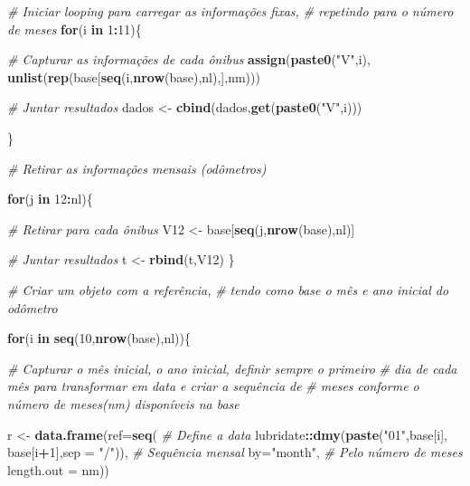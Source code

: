 \documentclass[]{article}
\newenvironment{Shaded}{\begin{snugshade}}{\end{snugshade}}
\newcommand{\CommentTok}[1]{\textcolor[rgb]{0.56,0.35,0.01}{\textit{#1}}}
\newcommand{\ControlFlowTok}[1]{\textcolor[rgb]{0.13,0.29,0.53}{\textbf{#1}}}
\newcommand{\DataTypeTok}[1]{\textcolor[rgb]{0.13,0.29,0.53}{#1}}
\newcommand{\DecValTok}[1]{\textcolor[rgb]{0.00,0.00,0.81}{#1}}
\newcommand{\KeywordTok}[1]{\textcolor[rgb]{0.13,0.29,0.53}{\textbf{#1}}}
\newcommand{\NormalTok}[1]{#1}
\newcommand{\OperatorTok}[1]{\textcolor[rgb]{0.81,0.36,0.00}{\textbf{#1}}}
\newcommand{\StringTok}[1]{\textcolor[rgb]{0.31,0.60,0.02}{#1}}
\begin{document}
\begin{Shaded}
\begin{Highlighting}[]
\CommentTok{# Iniciar looping para carregar as informações fixas,}
\CommentTok{# repetindo para o número de meses}
\ControlFlowTok{for}\NormalTok{(i }\ControlFlowTok{in} \DecValTok{1}\OperatorTok{:}\DecValTok{11}\NormalTok{)\{}
  
  \CommentTok{# Capturar as informações de cada ônibus}
  \KeywordTok{assign}\NormalTok{(}\KeywordTok{paste0}\NormalTok{(}\StringTok{"V"}\NormalTok{,i), }\KeywordTok{unlist}\NormalTok{(}\KeywordTok{rep}\NormalTok{(base[}\KeywordTok{seq}\NormalTok{(i,}\KeywordTok{nrow}\NormalTok{(base),nl),],nm)))}
  
  \CommentTok{# Juntar resultados}
\NormalTok{  dados <-}\StringTok{ }\KeywordTok{cbind}\NormalTok{(dados,}\KeywordTok{get}\NormalTok{(}\KeywordTok{paste0}\NormalTok{(}\StringTok{"V"}\NormalTok{,i)))}
  
\NormalTok{\}}

\CommentTok{# Retirar as informações mensais (odômetros)}
  
  \ControlFlowTok{for}\NormalTok{(j }\ControlFlowTok{in} \DecValTok{12}\OperatorTok{:}\NormalTok{nl)\{}
    
    
    \CommentTok{# Retirar para cada ônibus}
\NormalTok{    V12 <-}\StringTok{ }\NormalTok{base[}\KeywordTok{seq}\NormalTok{(j,}\KeywordTok{nrow}\NormalTok{(base),nl)]}
    
    \CommentTok{# Juntar resultados}
\NormalTok{    t <-}\StringTok{ }\KeywordTok{rbind}\NormalTok{(t,V12)}
\NormalTok{\}}

\CommentTok{# Criar um objeto com a referência,}
\CommentTok{# tendo como base o mês e ano inicial do odômetro}

  
  \ControlFlowTok{for}\NormalTok{(i }\ControlFlowTok{in} \KeywordTok{seq}\NormalTok{(}\DecValTok{10}\NormalTok{,}\KeywordTok{nrow}\NormalTok{(base),nl))\{}
    
    \CommentTok{# Capturar o mês inicial, o ano inicial, definir sempre o primeiro}
    \CommentTok{# dia de cada mês para transformar em data e criar a sequência de }
    \CommentTok{# meses conforme o número de meses(nm) disponíveis na base}
    
\NormalTok{    r <-}\StringTok{ }\KeywordTok{data.frame}\NormalTok{(}\DataTypeTok{ref=}\KeywordTok{seq}\NormalTok{(}
      \CommentTok{# Define a data}
\NormalTok{      lubridate}\OperatorTok{::}\KeywordTok{dmy}\NormalTok{(}\KeywordTok{paste}\NormalTok{(}\StringTok{"01"}\NormalTok{,base[i],}
\NormalTok{                           base[i}\OperatorTok{+}\DecValTok{1}\NormalTok{],}\DataTypeTok{sep =} \StringTok{"/"}\NormalTok{)),}
      \CommentTok{# Sequência mensal}
      \DataTypeTok{by=}\StringTok{"month"}\NormalTok{,}
      \CommentTok{# Pelo número de meses}
      \DataTypeTok{length.out =}\NormalTok{ nm))}
  

\end{Highlighting}
\end{Shaded}
\end{document}
